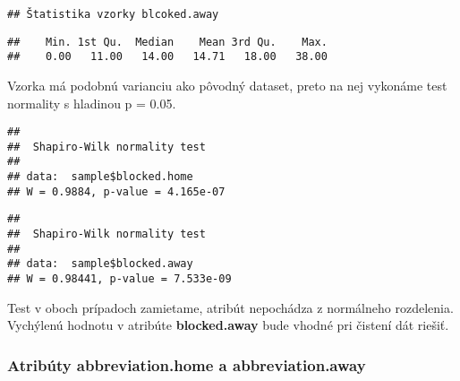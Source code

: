 \documentclass[
]{article}
\newenvironment{Shaded}{\begin{snugshade}}{\end{snugshade}}
\newcommand{\FunctionTok}[1]{\textcolor[rgb]{0.00,0.00,0.00}{#1}}
\newcommand{\NormalTok}[1]{#1}
\newcommand{\SpecialCharTok}[1]{\textcolor[rgb]{0.00,0.00,0.00}{#1}}
\begin{document}
\begin{verbatim}
## Štatistika vzorky blcoked.away
\end{verbatim}

\begin{Shaded}
\end{Shaded}

\begin{verbatim}
##    Min. 1st Qu.  Median    Mean 3rd Qu.    Max. 
##    0.00   11.00   14.00   14.71   18.00   38.00
\end{verbatim}

Vzorka má podobnú varianciu ako pôvodný dataset, preto na nej vykonáme
test normality s hladinou p = 0.05.

\begin{Shaded}
\end{Shaded}

\begin{verbatim}
## 
##  Shapiro-Wilk normality test
## 
## data:  sample$blocked.home
## W = 0.9884, p-value = 4.165e-07
\end{verbatim}

\begin{Shaded}
\end{Shaded}

\begin{verbatim}
## 
##  Shapiro-Wilk normality test
## 
## data:  sample$blocked.away
## W = 0.98441, p-value = 7.533e-09
\end{verbatim}

Test v oboch prípadoch zamietame, atribút nepochádza z normálneho
rozdelenia. Vychýlenú hodnotu v atribúte \textbf{blocked.away} bude
vhodné pri čistení dát riešiť.

\hypertarget{atribuxfaty-abbreviation.home-a-abbreviation.away}{%
\subsubsection{Atribúty abbreviation.home a
abbreviation.away}\label{atribuxfaty-abbreviation.home-a-abbreviation.away}}
\end{document}
